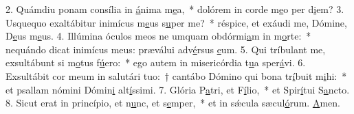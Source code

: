 2. Quámdiu ponam consília in \uline{á}nima m\uline{e}a,~* dolórem in corde m\uline{e}o per d\uline{i}em?
3. Usquequo exaltábitur inimícus m\uline{e}us s\uline{u}per me?~* réspice, et exáudi me, Dómine, D\uline{e}us m\uline{e}us.
4. Illúmina óculos meos ne umquam obdórmi\uline{a}m in m\uline{o}rte:~* nequándo dicat inimícus meus: præválui adv\uline{é}rsus \uline{e}um.
5. Qui tríbulant me, exsultábunt si m\uline{o}tus f\uline{ú}ero:~* ego autem in misericórdia t\uline{u}a sper\uline{á}vi.
6. Exsultábit cor meum in salutári tuo:~† cantábo Dómino qui bona tr\uline{í}buit m\uline{i}hi:~* et psallam nómini Dómin\uline{i} alt\uline{í}ssimi.
7. Glória P\uline{a}tri, et F\uline{í}lio,~* et Spir\uline{í}tui S\uline{a}ncto.
8. Sicut erat in princípio, et n\uline{u}nc, et s\uline{e}mper,~* et in sǽcula sæcul\uline{ó}rum. \uline{A}men.

